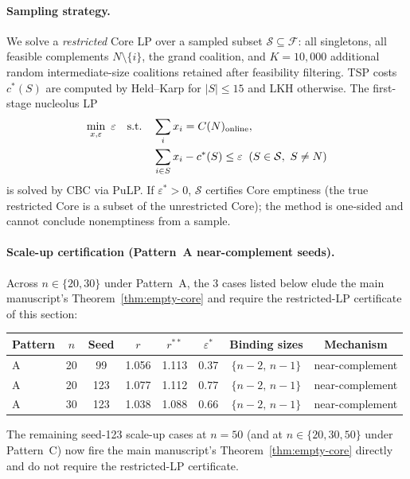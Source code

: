\documentclass[11pt]{article}
\theoremstyle{plain}
\theoremstyle{definition}
\theoremstyle{remark}
\begin{document}
\paragraph{Sampling strategy.} We solve a \emph{restricted} Core LP over a sampled subset $\mathcal{S}\subseteq\mathcal{F}$: all singletons, all feasible complements $N\setminus\{i\}$, the grand coalition, and $K=10{,}000$ additional random intermediate-size coalitions retained after feasibility filtering. TSP costs $c^{\ast}(S)$ are computed by Held--Karp for $|S|\le 15$ and LKH \citep{helsgaun2000effective} otherwise. The first-stage nucleolus LP
\begin{align}
  \min_{x,\varepsilon}\ \varepsilon\quad\text{s.t.}\quad
  & \sum_i x_i = C(N)_{\text{online}}, \notag \\
  & \sum_{i\in S} x_i - c^{\ast}(S)\le \varepsilon\;\;(S\in\mathcal{S},\ S\ne N) \notag
\end{align}
is solved by CBC via PuLP. If $\varepsilon^{\ast}>0$, $\mathcal{S}$ certifies Core emptiness (the true restricted Core is a subset of the unrestricted Core); the method is one-sided and cannot conclude nonemptiness from a sample.

\paragraph{Scale-up certification (Pattern~A near-complement seeds).} Across $n\in\{20,30\}$ under Pattern~A, the 3 cases listed below elude the main manuscript's Theorem~\ref{thm:empty-core} and require the restricted-LP certificate of this section:
\begin{center}
\footnotesize
\begin{tabular}{@{}lccccccc@{}}
\toprule
Pattern & $n$ & Seed & $r$ & $r^{\ast\ast}$ & $\varepsilon^{\ast}$ & Binding sizes & Mechanism \\
\midrule
A & 20 &  99 & 1.056 & 1.113 & $0.37$ & $\{n-2,\,n-1\}$ & near-complement \\
A & 20 & 123 & 1.077 & 1.112 & $0.77$ & $\{n-2,\,n-1\}$ & near-complement \\
A & 30 & 123 & 1.038 & 1.088 & $0.66$ & $\{n-2,\,n-1\}$ & near-complement \\
\bottomrule
\end{tabular}
\end{center}
The remaining seed-123 scale-up cases at $n=50$ (and at $n\in\{20,30,50\}$ under Pattern~C) now fire the main manuscript's Theorem~\ref{thm:empty-core} directly and do not require the restricted-LP certificate.
\end{document}
